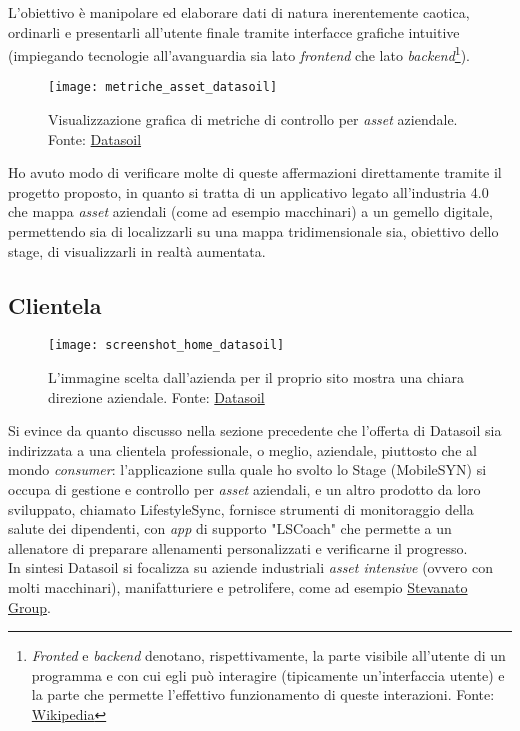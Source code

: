 L'obiettivo è manipolare ed elaborare dati di natura inerentemente caotica, ordinarli e presentarli all'utente finale tramite interfacce grafiche intuitive (impiegando tecnologie all'avanguardia sia lato \textit{frontend} che lato \textit{backend}\footnote{\textit{Fronted} e \textit{backend} denotano, rispettivamente, la parte visibile all'utente di un programma e con cui egli può interagire (tipicamente un'interfaccia utente) e la parte che permette l'effettivo funzionamento di queste interazioni. {\tiny Fonte: \href{https://it.wikipedia.org/wiki/Front-end_e_back-end}{Wikipedia}}}).\\
\begin{figure}[ht]
    \centering
    \texttt{[image: metriche\_asset\_datasoil]}
    \caption{Visualizzazione grafica di metriche di controllo per \textit{asset} aziendale. Fonte: \href{https://datasoil.it/industry-40-smartcity-syn-asset-performance/monitoraggio-asset/}{Datasoil}}
\end{figure}\aCapo{}
Ho avuto modo di verificare molte di queste affermazioni direttamente tramite il progetto proposto, in quanto si tratta di un applicativo legato all'industria 4.0 che mappa \textit{asset} aziendali (come ad esempio macchinari) a un gemello digitale, permettendo sia di localizzarli su una mappa tridimensionale sia, obiettivo dello stage, di visualizzarli in realtà aumentata.\\

\subsection{Clientela}
\begin{figure}[ht]
    \centering
    \texttt{[image: screenshot\_home\_datasoil]}
    \caption{L'immagine scelta dall'azienda per il proprio sito mostra una chiara direzione aziendale. Fonte: \href{https://datasoil.it/industry-40-smartcity-syn-asset-performance/}{Datasoil}}
\end{figure}\aCapo{}
Si evince da quanto discusso nella sezione precedente che l'offerta di Datasoil sia indirizzata a una clientela professionale, o meglio, aziendale, piuttosto che al mondo \textit{consumer}: 
l'applicazione sulla quale ho svolto lo Stage (MobileSYN) si occupa di gestione e controllo per \textit{asset} aziendali, e un altro prodotto da loro sviluppato, chiamato LifestyleSync, fornisce strumenti di monitoraggio della salute dei dipendenti, con \textit{app} di supporto "LSCoach" che permette a un allenatore di preparare allenamenti personalizzati e verificarne il progresso.\\
In sintesi Datasoil si focalizza su aziende industriali \textit{asset intensive} (ovvero con molti macchinari), manifatturiere e petrolifere, come ad esempio \href{https://www.stevanatogroup.com/it/}{Stevanato Group}.\\

